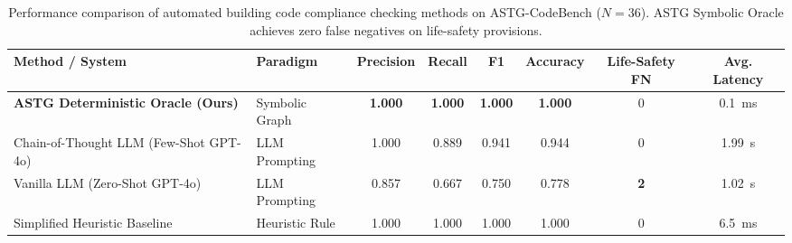 \begin{table}[t]
\centering
\small
\caption{Performance comparison of automated building code compliance checking methods on ASTG-CodeBench ($N=36$). ASTG Symbolic Oracle achieves zero false negatives on life-safety provisions.}
\label{tab:baseline_comparison}
\begin{tabular}{llcccccc}
\toprule
\textbf{Method / System} & \textbf{Paradigm} & \textbf{Precision} & \textbf{Recall} & \textbf{F1} & \textbf{Accuracy} & \textbf{Life-Safety FN} & \textbf{Avg. Latency} \\
\midrule
\textbf{ASTG Deterministic Oracle (Ours)} & Symbolic Graph & \textbf{1.000} & \textbf{1.000} & \textbf{1.000} & \textbf{1.000} & 0 & 0.1~ms \\
Chain-of-Thought LLM (Few-Shot GPT-4o) & LLM Prompting & 1.000 & 0.889 & 0.941 & 0.944 & 0 & 1.99~s \\
Vanilla LLM (Zero-Shot GPT-4o) & LLM Prompting & 0.857 & 0.667 & 0.750 & 0.778 & \textbf{2} & 1.02~s \\
Simplified Heuristic Baseline & Heuristic Rule & 1.000 & 1.000 & 1.000 & 1.000 & 0 & 6.5~ms \\
\bottomrule
\end{tabular}
\end{table}